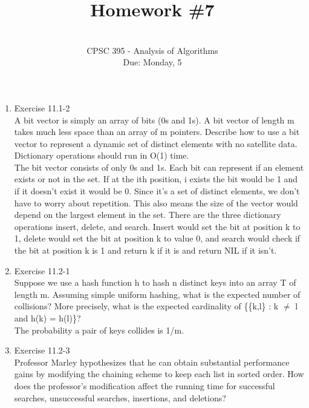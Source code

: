 \documentclass[12pt]{article}
\begin{document}
 
 
 
\title{Homework \#7}%
\author{\\ %
CPSC 395 - Analysis of Algorithms
\\ Due: Monday, 5} %
\date{}
\maketitle

\begin{enumerate}
\item Exercise 11.1-2\\
A bit vector is simply an array of bits (0s and 1s). A bit vector of length m takes
much less space than an array of m pointers. Describe how to use a bit vector
to represent a dynamic set of distinct elements with no satellite data. Dictionary
operations should run in O(1) time. \\

The bit vector consists of only 0s and 1s. Each bit can represent if an element exists or not in the set. If at the ith position, i exists the bit would be 1 and if it doesn't exist it would be 0. Since it's a set of distinct elements, we don't have to worry about repetition. This also means the size of the vector would depend on the largest element in the set. There are the three dictionary operations insert, delete, and search. Insert would set the bit at position k to 1, delete would set the bit at position k to value 0, and search would check if the bit at position k is 1 and return k if it is and return NIL if it isn't.

\item Exercise 11.2-1 \\
Suppose we use a hash function h to hash n distinct keys into an array T of
length m. Assuming simple uniform hashing, what is the expected number of
collisions? More precisely, what is the expected cardinality of \{\{k,l\} : k $\neq$ l and h(k) = h(l)\}? \\

The probability a pair of keys collides is 1/m.

\item Exercise 11.2-3 \\
Professor Marley hypothesizes that he can obtain substantial performance gains by
modifying the chaining scheme to keep each list in sorted order. How does the professor’s
modification affect the running time for successful searches, unsuccessful
searches, insertions, and deletions? \\


\end{enumerate}
\end{document}
